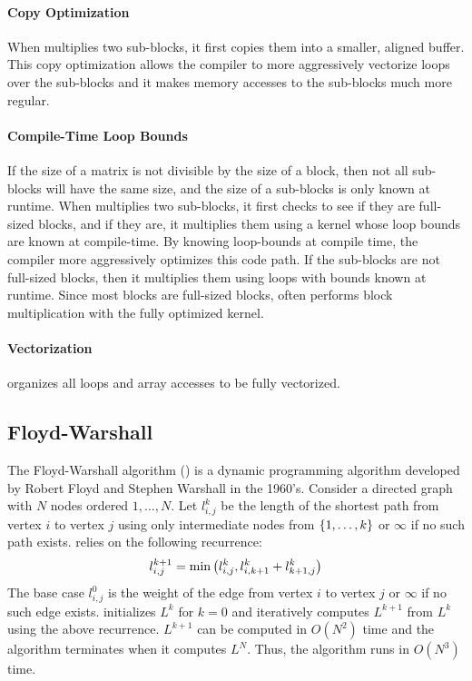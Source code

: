 \paragraph{Copy Optimization}
When \block{} multiplies two sub-blocks, it first copies them into a smaller,
aligned buffer. This copy optimization allows the compiler to more aggressively
vectorize loops over the sub-blocks and it makes memory accesses to the
sub-blocks much more regular.

\paragraph{Compile-Time Loop Bounds}
If the size of a matrix is not divisible by the size of a block, then not all
sub-blocks will have the same size, and the size of a sub-blocks is only known
at runtime. When \block{} multiplies two sub-blocks, it first checks to see if
they are full-sized blocks, and if they are, it multiplies them using a kernel
whose loop bounds are known at compile-time. By knowing loop-bounds at compile
time, the compiler more aggressively optimizes this code path.  If the
sub-blocks are not full-sized blocks, then it multiplies them using loops with
bounds known at runtime. Since most blocks are full-sized blocks, \block{}
often performs block multiplication with the fully optimized kernel.

\paragraph{Vectorization}
\block{} organizes all loops and array accesses to be fully vectorized.

\subsection{Floyd-Warshall}
The Floyd-Warshall algorithm (\fw{}) is a dynamic programming algorithm
developed by Robert Floyd and Stephen Warshall in the 1960's. Consider a
directed graph  with $N$ nodes ordered $1, \ldots, N$. Let $l_{i,j}^k$ be the
length of the shortest path from vertex $i$ to vertex $j$ using only
intermediate nodes from $\left\{{1, \ldots, k}\right\}$ or $\infty$ if no such path
exists. \fw{} relies on the following recurrence:
\[
  l_{i,j}^{k+1} = \min \left({l_{i,j}^k, l_{i,k+1}^k + l_{k+1,j}^k}\right)
\]
The base case $l_{i,j}^0$ is the weight of the edge from vertex $i$ to vertex
$j$ or $\infty$ if no such edge exists. \fw{} initializes $L^k$ for $k=0$ and
iteratively computes $L^{k+1}$ from $L^{k}$ using the above recurrence.
$L^{k+1}$ can be computed in $O(N^2)$ time and the algorithm terminates when it
computes $L^N$. Thus, the algorithm runs in $O(N^3)$ time.
